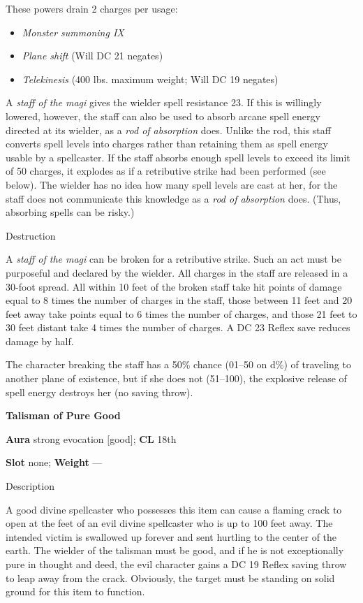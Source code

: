 These powers drain 2 charges per usage:
				\begin{itemize}\item  \textit{Monster summoning IX}
				\item  \textit{Plane shift} (Will DC 21 negates)
				\item  \textit{Telekinesis} (400 lbs. maximum weight; Will DC 19 negates)
\end{itemize}
				
A \textit{staff of the magi} gives the wielder spell resistance 23. If this is willingly lowered, however, the staff can also be used to absorb arcane spell energy directed at its wielder, as a \textit{rod of absorption} does. Unlike the rod, this staff converts spell levels into charges rather than retaining them as spell energy usable by a spellcaster. If the staff absorbs enough spell levels to exceed its limit of 50 charges, it explodes as if a retributive strike had been performed (see below). The wielder has no idea how many spell levels are cast at her, for the staff does not communicate this knowledge as a \textit{rod of absorption} does. (Thus, absorbing spells can be risky.)
				
Destruction
				
A \textit{staff of the magi} can be broken for a retributive strike. Such an act must be purposeful and declared by the wielder. All charges in the staff are released in a 30-foot spread. All within 10 feet of the broken staff take hit points of damage equal to 8 times the number of charges in the staff, those between 11 feet and 20 feet away take points equal to 6 times the number of charges, and those 21 feet to 30 feet distant take 4 times the number of charges. A DC 23 Reflex save reduces damage by half. 
				
The character breaking the staff has a 50\% chance (01--50 on d\%) of traveling to another plane of existence, but if she does not (51--100), the explosive release of spell energy destroys her (no saving throw). 
				
\textbf{Talisman of Pure Good}
				
\textbf{Aura} strong evocation \mbox{$[$}good\mbox{$]$}; \textbf{CL} 18th
				
\textbf{Slot} none; \textbf{Weight }---
				
Description
				
A good divine spellcaster who possesses this item can cause a flaming crack to open at the feet of an evil divine spellcaster who is up to 100 feet away. The intended victim is swallowed up forever and sent hurtling to the center of the earth. The wielder of the talisman must be good, and if he is not exceptionally pure in thought and deed, the evil character gains a DC 19 Reflex saving throw to leap away from the crack. Obviously, the target must be standing on solid ground for this item to function. 
				
